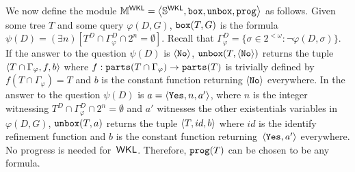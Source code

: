We now define the module $\mathbb{M}^{\operatorname{\sf{WKL}}} = \left\langle \mathbb{S}^{\operatorname{\sf{WKL}}}, \mathtt{box}, \mathtt{unbox}, \mathtt{prog} \right\rangle$ as follows.
Given some tree $T$ and some query $\varphi(D, G)$, $\mathtt{box}(T, G)$ is the formula
$\psi(D) = (\exists n)[T^D \cap \Gamma^D_\varphi \cap 2^n = \emptyset]$.
Recall that $\Gamma^D_\varphi = \{\sigma \in 2^{<\omega} : \neg \varphi(D, \sigma) \}$.
If the answer to the question $\psi(D)$ is $\left\langle \mathtt{No} \right\rangle$,
$\mathtt{unbox}(T, \left\langle \mathtt{No} \right\rangle)$ returns the tuple $\left\langle T \cap \Gamma_\varphi, f, b \right\rangle$
where $f : \mathtt{parts}(T \cap \Gamma_\varphi) \to \mathtt{parts}(T)$ is trivially defined by $f(T \cap \Gamma_\varphi) = T$
and $b$ is the constant function returning $\left\langle \mathtt{No} \right\rangle$ everywhere.
In the answer to the question $\psi(D)$ is $a = \left\langle \mathtt{Yes}, n, a' \right\rangle$, where $n$ is the integer witnessing
$T^D \cap \Gamma^D_\varphi \cap 2^n = \emptyset$ and $a'$ witnesses the other existentials variables in $\varphi(D, G)$,
$\mathtt{unbox}(T, a)$ returns the tuple $\left\langle T, id, b \right\rangle$
where $id$ is the identify refinement function and $b$ is the constant function returning~$\left\langle \mathtt{Yes}, a' \right\rangle$ everywhere.
No progress is needed for~$\operatorname{\sf{WKL}}$. Therefore, $\mathtt{prog}(T)$ can be chosen to be any formula.


